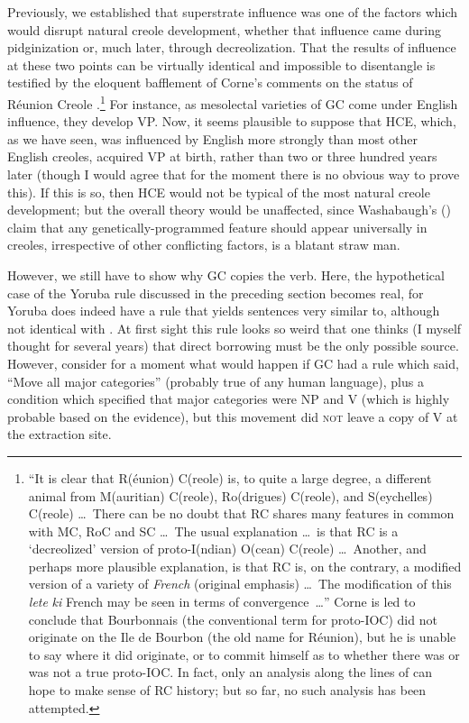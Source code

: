Previously, we established that superstrate influence was one of the factors which would disrupt natural creole development, whether that influence came during pidginization or, much later, through
decreolization. That the results of influence at these two points can be virtually identical and impossible to disentangle is testified by the eloquent bafflement of Corne's comments on the status of Réunion Creole \citep[223--224]{Corne1977}.\footnote{``It is clear that R(éunion) C(reole) is, to quite a large degree, a different animal from M(auritian) C(reole), Ro(drigues) C(reole), and S(eychelles) C(reole) \ldots~There can be no doubt that RC shares many features in common with MC, RoC and SC \ldots~The usual explanation \ldots~is that RC is a `decreolized' version of proto-I(ndian) O(cean) C(reole) \ldots~Another, and perhaps more plausible explanation, is that RC is, on the contrary, a modified version of a variety of \textit{French} (original emphasis) \ldots~The modification of this \textit{lete} \textit{ki} French may be seen in terms of convergence~\ldots'' Corne is led to conclude that Bourbonnais (the conventional term for proto-IOC) did not originate on the Ile de Bourbon (the old name for Réunion), but he is unable to say where it did originate, or to commit himself as to whether there was or was not a true proto-IOC. In fact, only an analysis along the lines of \citet{Bickerton1975} can hope to make sense of RC history; but so far, no such analysis has been attempted.} For instance, as mesolectal varieties of GC come under English influence, they develop VP. Now, it seems plausible to suppose that HCE, which, as we have seen, was influenced by English more strongly than most other English creoles, acquired VP at birth, rather than two or three hundred years later (though I would agree that for the moment there is no obvious way to prove this). If this is so, then HCE would not be typical of the most natural creole development; but the overall theory would be unaffected, since Washabaugh's (\citeyear{Washabaugh1979}) claim that any genetically-programmed feature should appear universally in creoles, irrespective of other conflicting factors, is a blatant straw man.

However, we still have to show why GC copies the verb. Here, the hypothetical case of the Yoruba rule discussed in the preceding section becomes real, for Yoruba does indeed have a rule that yields sentences very similar to, although not identical with . At first sight this rule looks so weird that one thinks (I myself thought for several years) that direct borrowing must be the only possible source. However, consider for a moment what would happen if GC had a rule which said, ``Move all major categories'' (probably true of any human lan\-guage), plus a condition which specified that major categories were NP and V (which is highly probable based on the evidence), but this movement did \textsc{not} leave a copy of V at the extraction site.

